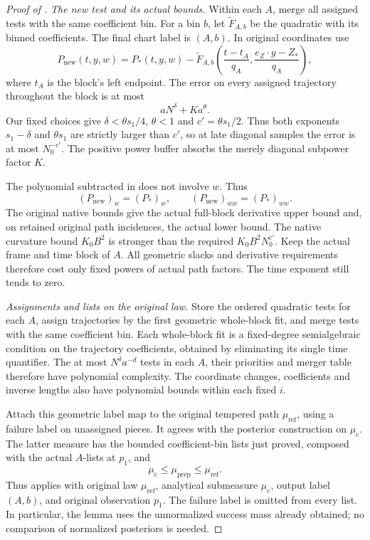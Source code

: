 \begin{proof}[Proof of ]
\emph{The new test and its actual bounds.}
Within each \(A\), merge all assigned tests with the same coefficient
bin. For a bin \(b\), let
\(\widetilde F_{A,b}\) be the quadratic with its binned coefficients.
The final chart label is \((A,b)\).
In original coordinates use
\begin{equation}
 \label{a08:final-test}
 P_{\mathrm{new}}(t,y,w)
   =P_*(t,y,w)
    -\widetilde F_{A,b}\left(
       \frac{t-t_A}{q_A},
       \frac{e_Z\cdot y-Z_*}{q_A}\right),
\end{equation}
where \(t_A\) is the block's left endpoint.
The error on every assigned trajectory throughout the block is
at most
\[
 aN^\delta+Ka^\theta.
\]
Our fixed choices give \(\delta<\theta s_1/4\),
\(\theta<1\) and \(c'=\theta s_1/2\).  Thus both exponents
\(s_1-\delta\) and \(\theta s_1\) are strictly larger than \(c'\),
so at late diagonal samples the error is at most \(N_0^{-c'}\).
The positive power buffer absorbs the merely diagonal subpower
factor \(K\).

The polynomial subtracted in  does not involve
\(w\).  Thus
\[
 (P_{\mathrm{new}})_w=(P_*)_w,\qquad
 (P_{\mathrm{new}})_{ww}=(P_*)_{ww}.
\]
The original native bounds give the actual full-block derivative
upper bound and, on retained original path incidences, the actual
lower bound.  The native curvature bound \(K_0B^2\) is stronger
than the required \(K_0B^2N_0^{c'}\).
Keep the actual frame and time block of \(A\).  All geometric
slacks and derivative requirements therefore cost only fixed
powers of actual path factors.  The time exponent still tends
to zero.

\emph{Assignments and lists on the original law.}
Store the ordered quadratic tests for each \(A\), assign trajectories
by the first geometric whole-block fit, and merge tests with the same
coefficient bin. Each whole-block fit is a fixed-degree semialgebraic
condition on the trajectory coefficients, obtained by eliminating its
single time quantifier. The at most \(N^\delta a^{-d}\) tests in each
\(A\), their priorities and merger table therefore have polynomial
complexity. The coordinate changes, coefficients and inverse lengths
also have polynomial bounds within each fixed \(i\).

Attach this geometric label map to the original tempered path
\(\mu_{\mathrm{ref}}\), using a failure label on unassigned pieces.
It agrees with the posterior construction on \(\mu_{\mathrm c}\).
The latter measure has the bounded coefficient-bin lists just proved,
composed with the actual \(A\)-lists at \(p_1\), and
\[
 \mu_{\mathrm c}\le\mu_{\mathrm{prep}}\le\mu_{\mathrm{ref}}.
\]
Thus  applies with original law
\(\mu_{\mathrm{ref}}\), analytical submeasure \(\mu_{\mathrm c}\),
output label \((A,b)\), and original observation
\(p_1\). The failure label is omitted from every list. In particular,
the lemma uses the unnormalized success mass already obtained; no
comparison of normalized posteriors is needed.


\end{proof}
